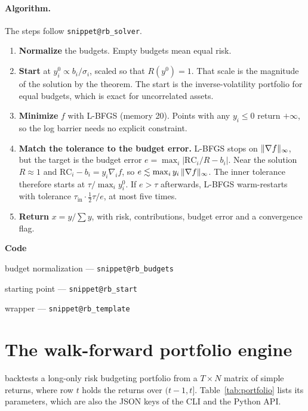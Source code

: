 \documentclass[11pt,a4paper]{article}
\makeatletter
\newcommand{\snippetsource}[1]{\csname snippet@#1\endcsname}
\newcommand{\snippet}[3]{%
  }
\newcommand{\coderef}[1]{{\footnotesize\texttt{\snippetsource{#1}}}}
\newenvironment{codepointers}{%
  \par\smallskip\begingroup\footnotesize\noindent\textcolor{blue!50!black}{\textbf{Code}}\par\nopagebreak
  \begin{list}{}{\setlength{\leftmargin}{1.2em}\setlength{\itemsep}{0pt}\setlength{\parsep}{0pt}\setlength{\topsep}{1pt}}}%
  {\end{list}\endgroup\smallskip}
\newcommand{\codeitem}[2]{\item #2 --- \texttt{\snippetsource{#1}}}
\makeatother
\begin{document}
\paragraph{Algorithm.} The steps follow \coderef{rb_solver}.
\begin{enumerate}
  \item \textbf{Normalize} the budgets. Empty budgets mean equal risk.
  \item \textbf{Start} at $y^0_i\propto b_i/\sigma_i$, scaled so that $R(y^0)=1$. That
        scale is the magnitude of the solution by the theorem. The start is the
        inverse-volatility portfolio for equal budgets, which is exact for uncorrelated
        assets.
  \item \textbf{Minimize} $f$ with L-BFGS (memory 20). Points with any $y_i\le0$ return
        $+\infty$, so the log barrier needs no explicit constraint.
  \item \textbf{Match the tolerance to the budget error.} L-BFGS stops on
        $\lVert \nabla f\rVert_\infty$, but the target is the budget error
        $e=\max_i|\mathrm{RC}_i/R-b_i|$. Near the solution $R\approx1$ and
        $\mathrm{RC}_i-b_i=y_i\nabla_if$, so $e\lesssim\max_iy_i\,\lVert \nabla f\rVert_\infty$.
        The inner tolerance therefore starts at $\tau/\max_iy^0_i$. If $e>\tau$ afterwards,
        L-BFGS warm-restarts with tolerance $\tau_{\text{in}}\cdot\tfrac12\tau/e$, at most five
        times.
  \item \textbf{Return} $x=y/\sum y$, with risk, contributions, budget error and a
        convergence flag.
\end{enumerate}
\snippet{rb_objective}{C++}{Objective and gradient, for any risk measure}
\snippet{rb_solve}{C++}{Tolerance matching on the budget error}
\begin{codepointers}
  \codeitem{rb_budgets}{budget normalization}
  \codeitem{rb_start}{starting point}
  \codeitem{rb_template}{ wrapper}
\end{codepointers}

\section{The walk-forward portfolio engine}\label{sec:engine}

 backtests a long-only risk budgeting portfolio from a
$T\times N$ matrix of simple returns, where row $t$ holds the returns over $(t-1,t]$.
Table~\ref{tab:portfolio} lists its parameters, which are also the JSON keys of the CLI and
the Python API.
\end{document}
